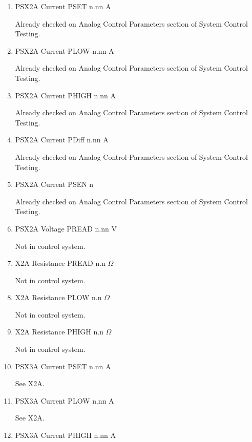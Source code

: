 \documentclass[11pt]{book}		%
\begin{document}
\begin{enumerate}
 \item PSX2A Current PSET  n.nn A

\color{red}
Already checked on Analog Control Parameters section of System Control Testing.
\color{black}

 \item PSX2A Current PLOW  n.nn A

\color{red}
Already checked on Analog Control Parameters section of System Control Testing.
\color{black}

 \item PSX2A Current PHIGH n.nn A

\color{red}
Already checked on Analog Control Parameters section of System Control Testing.
\color{black}

 \item PSX2A Current PDiff n.nn A

\color{red}
Already checked on Analog Control Parameters section of System Control Testing.
\color{black}

 \item PSX2A Current PSEN  n

\color{red}
Already checked on Analog Control Parameters section of System Control Testing.
\color{black}

 \item PSX2A Voltage PREAD n.nn V

\color{red}
Not in control system.
\color{black}

 \item X2A Resistance PREAD n.n $\Omega$

\color{red}
Not in control system.
\color{black}

 \item X2A Resistance PLOW n.n $\Omega$

\color{red}
Not in control system.
\color{black}

 \item X2A Resistance PHIGH n.n $\Omega$

\color{red}
Not in control system.
\color{black}

 \item PSX3A Current PSET  n.nn A

\color{red}
See X2A.
\color{black}

 \item PSX3A Current PLOW  n.nn A

\color{red}
See X2A.
\color{black}

 \item PSX3A Current PHIGH n.nn A


\end{enumerate}
\end{document}
